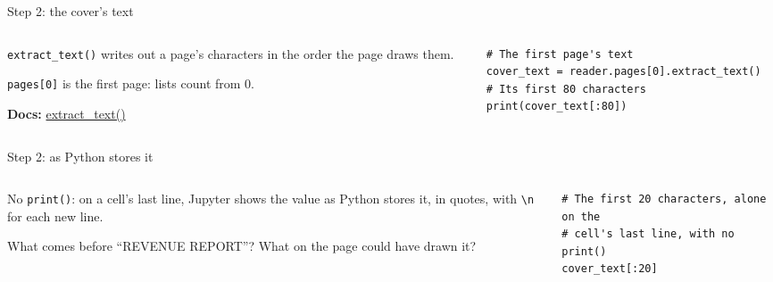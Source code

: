 \documentclass[9pt,aspectratio=169]{beamer}
\begin{document}
\begin{frame}[fragile]{Step 2: the cover's text}
    \begin{columns}[T]
        \begin{column}{0.37\textwidth}
            \texttt{extract\_text()} writes out a page's characters in the order the page draws them.

            \medskip
            \texttt{pages[0]} is the first page: lists count from 0.

            \medskip
            {\scriptsize\textbf{Docs:} \href{https://pypdf.readthedocs.io/en/stable/user/extract-text.html}{extract\_text()}\par}
        \end{column}
        \begin{column}{0.6\textwidth}
\begin{lstlisting}
# The first page's text
cover_text = reader.pages[0].extract_text()
# Its first 80 characters
print(cover_text[:80])
\end{lstlisting}
        \end{column}
    \end{columns}
\end{frame}

\begin{frame}[fragile]{Step 2: as Python stores it}
    \begin{columns}[T]
        \begin{column}{0.37\textwidth}
            No \texttt{print()}: on a cell's last line, Jupyter shows the value as Python stores it, in quotes, with \texttt{\textbackslash n} for each new line.

            \medskip
            What comes before ``REVENUE REPORT''? What on the page could have drawn it?
        \end{column}
        \begin{column}{0.6\textwidth}
\begin{lstlisting}
# The first 20 characters, alone on the
# cell's last line, with no print()
cover_text[:20]
\end{lstlisting}
        \end{column}
    \end{columns}
\end{frame}
\end{document}
